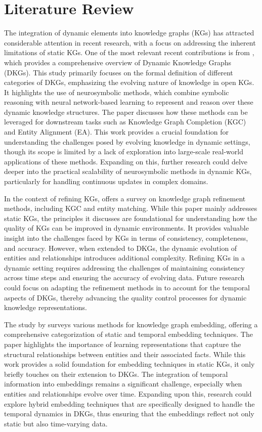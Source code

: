 \section{Literature Review}

The integration of dynamic elements into knowledge graphs (KGs) has attracted considerable attention in recent research, with a focus on addressing the inherent limitations of static KGs. 
One of the most relevant recent contributions is from \cite{polleres2023}, which provides a comprehensive overview of Dynamic Knowledge Graphs (DKGs). 
This study primarily focuses on the formal definition of different categories of DKGs, emphasizing the evolving nature of knowledge in open KGs. 
It highlights the use of neurosymbolic methods, which combine symbolic reasoning with neural network-based learning to represent and reason over these dynamic knowledge structures. 
The paper discusses how these methods can be leveraged for downstream tasks such as Knowledge Graph Completion (KGC) and Entity Alignment (EA). 
This work provides a crucial foundation for understanding the challenges posed by evolving knowledge in dynamic settings, though its scope is limited by a lack of exploration into large-scale 
real-world applications of these methods. Expanding on this, further research could delve deeper into the practical scalability of neurosymbolic methods in dynamic KGs, particularly for handling
continuous updates in complex domains.

In the context of refining KGs, \cite{paulheim2016} offers a survey on knowledge graph refinement methods, including KGC and entity matching. While this paper mainly addresses static KGs, 
the principles it discusses are foundational for understanding how the quality of KGs can be improved in dynamic environments. It provides valuable insight into the challenges faced by KGs 
in terms of consistency, completeness, and accuracy. However, when extended to DKGs, the dynamic evolution of entities and relationships introduces additional complexity. Refining KGs in a 
dynamic setting requires addressing the challenges of maintaining consistency across time steps and ensuring the accuracy of evolving data. Future research could focus on adapting the refinement
methods in \cite{luo2024} to account for the temporal aspects of DKGs, thereby advancing the quality control processes for dynamic knowledge representations.

The study by \cite{wang2016} surveys various methods for knowledge graph embedding, offering a comprehensive categorization of static and temporal embedding techniques. The paper highlights the 
importance of learning representations that capture the structural relationships between entities and their associated facts. While this work provides a solid foundation for embedding techniques
in static KGs, it only briefly touches on their extension to DKGs. The integration of temporal information into embeddings remains a significant challenge, especially when entities and 
relationships evolve over time. Expanding upon this, research could explore hybrid embedding techniques that are specifically designed to handle the temporal dynamics in DKGs, thus ensuring 
that the embeddings reflect not only static but also time-varying data.

